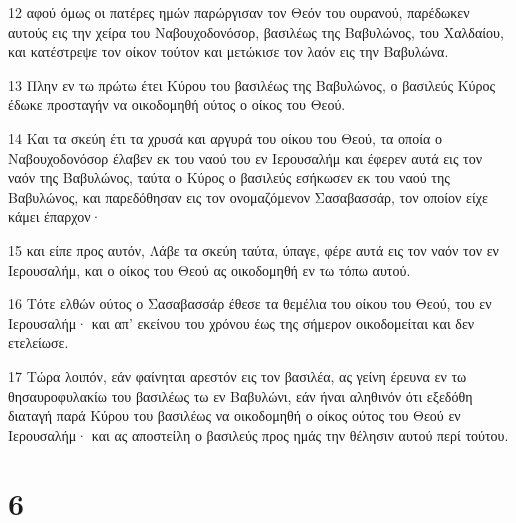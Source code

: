 \par 12 αφού όμως οι πατέρες ημών παρώργισαν τον Θεόν του ουρανού, παρέδωκεν αυτούς εις την χείρα του Ναβουχοδονόσορ, βασιλέως της Βαβυλώνος, του Χαλδαίου, και κατέστρεψε τον οίκον τούτον και μετώκισε τον λαόν εις την Βαβυλώνα.
\par 13 Πλην εν τω πρώτω έτει Κύρου του βασιλέως της Βαβυλώνος, ο βασιλεύς Κύρος έδωκε προσταγήν να οικοδομηθή ούτος ο οίκος του Θεού.
\par 14 Και τα σκεύη έτι τα χρυσά και αργυρά του οίκου του Θεού, τα οποία ο Ναβουχοδονόσορ έλαβεν εκ του ναού του εν Ιερουσαλήμ και έφερεν αυτά εις τον ναόν της Βαβυλώνος, ταύτα ο Κύρος ο βασιλεύς εσήκωσεν εκ του ναού της Βαβυλώνος, και παρεδόθησαν εις τον ονομαζόμενον Σασαβασσάρ, τον οποίον είχε κάμει έπαρχον·
\par 15 και είπε προς αυτόν, Λάβε τα σκεύη ταύτα, ύπαγε, φέρε αυτά εις τον ναόν τον εν Ιερουσαλήμ, και ο οίκος του Θεού ας οικοδομηθή εν τω τόπω αυτού.
\par 16 Τότε ελθών ούτος ο Σασαβασσάρ έθεσε τα θεμέλια του οίκου του Θεού, του εν Ιερουσαλήμ· και απ' εκείνου του χρόνου έως της σήμερον οικοδομείται και δεν ετελείωσε.
\par 17 Τώρα λοιπόν, εάν φαίνηται αρεστόν εις τον βασιλέα, ας γείνη έρευνα εν τω θησαυροφυλακίω του βασιλέως τω εν Βαβυλώνι, εάν ήναι αληθινόν ότι εξεδόθη διαταγή παρά Κύρου του βασιλέως να οικοδομηθή ο οίκος ούτος του Θεού εν Ιερουσαλήμ· και ας αποστείλη ο βασιλεύς προς ημάς την θέλησιν αυτού περί τούτου.

\chapter{6}

